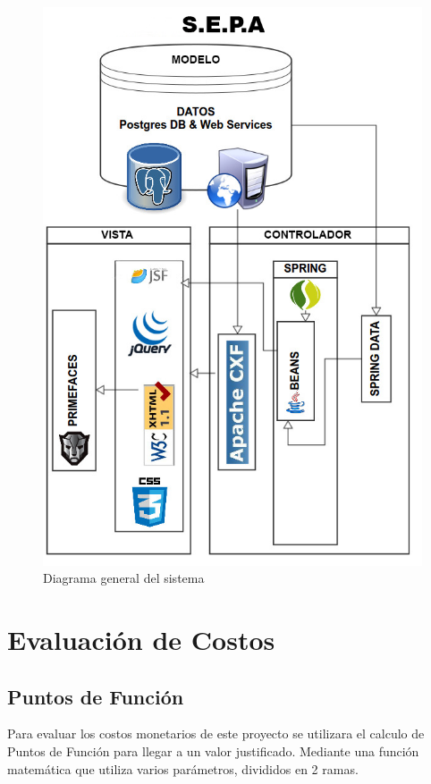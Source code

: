 \documentclass[a4paper,12pt,openany,oneside]{book}
\begin{document}
\begin{figure}[!hbp]
\begin{center}
\includegraphics[scale=0.6,angle=0]{images/diagrama.jpg}
\caption{Diagrama general del sistema}
\label{Diagrama general del sistema}
\end{center}
\end{figure}
\chapter{Evaluación de Costos}
\section{Puntos de Función}
Para evaluar los costos monetarios de este proyecto se utilizara el calculo de Puntos de Función para llegar a un valor justificado. Mediante una función matemática que utiliza varios parámetros, divididos en 2 ramas.
\end{document}
